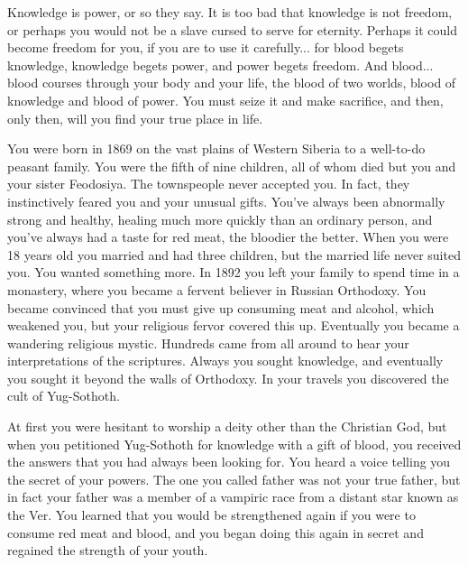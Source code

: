 \documentclass[char]{guildcamp4}
\begin{document}
\name{\cRasputin{}}


Knowledge is power, or so they say. It is too bad that knowledge is not freedom, or perhaps you would not be a slave cursed to serve for eternity. Perhaps it could become freedom for you, if you are to use it carefully... for blood begets knowledge, knowledge begets power, and power begets freedom. And blood... blood courses through your body and your life, the blood of two worlds, blood of knowledge and blood of power. You must seize it and make sacrifice, and then, only then, will you find your true place in life.

You were born in 1869 on the vast plains of Western Siberia to a well-to-do peasant family. You were the fifth of nine children, all of whom died but you and your sister Feodosiya. The townspeople never accepted you. In fact, they instinctively feared you and your unusual gifts. You've always been abnormally strong and healthy, healing much more quickly than an ordinary person, and you've always had a taste for red meat, the bloodier the better. When you were 18 years old you married and had three children, but the married life never suited you. You wanted something more. In 1892 you left your family to spend time in a monastery, where you became a fervent believer in Russian Orthodoxy. You became convinced that you must give up consuming meat and alcohol, which weakened you, but your religious fervor covered this up. Eventually you became a wandering religious mystic. Hundreds came from all around to hear your interpretations of the scriptures. Always you sought knowledge, and eventually you sought it beyond the walls of Orthodoxy. In your travels you discovered the cult of Yug-Sothoth.

At first you were hesitant to worship a deity other than the Christian God, but when you petitioned Yug-Sothoth for knowledge with a gift of blood, you received the answers that you had always been looking for. You heard a voice telling you the secret of your powers. The one you called father was not your true father, but in fact your father was a member of a vampiric race from a distant star known as the Ver. You learned that you would be strengthened again if you were to consume red meat and blood, and you began doing this again in secret and regained the strength of your youth. 
\end{document}
